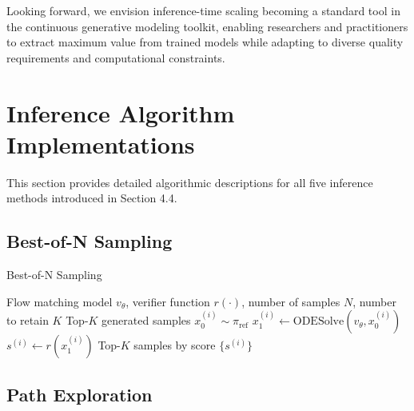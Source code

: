 \documentclass{article}
\begin{document}
Looking forward, we envision inference-time scaling becoming a standard tool in the continuous generative modeling toolkit, enabling researchers and practitioners to extract maximum value from trained models while adapting to diverse quality requirements and computational constraints.





\appendix

\section{Inference Algorithm Implementations}

This section provides detailed algorithmic descriptions for all five inference methods introduced in Section 4.4.

\subsection{Best-of-N Sampling}

\begin{algorithm}[H]
\caption{Best-of-N Sampling}
\label{alg:best-of-n}
\begin{algorithmic}[1]
\Require Flow matching model $v_\theta$, verifier function $r(\cdot)$, number of samples $N$, number to retain $K$
\Ensure Top-$K$ generated samples
    \State $x_0^{(i)} \sim \pi_{\text{ref}}$ 
    \State $x_1^{(i)} \leftarrow \text{ODESolve}(v_\theta, x_0^{(i)})$ 
    \State $s^{(i)} \leftarrow r(x_1^{(i)})$ 
\EndFor
\State \Return Top-$K$ samples by score $\{s^{(i)}\}$
\end{algorithmic}
\end{algorithm}

\subsection{Path Exploration}
\end{document}
